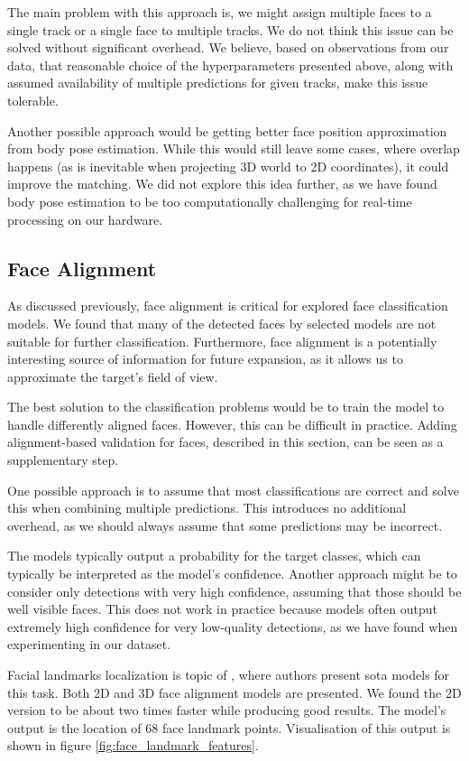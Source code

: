 The main problem with this approach is, we might assign multiple faces to a single track or a single face to multiple tracks. We do not think this issue can be solved without significant overhead. We believe, based on observations from our data, that reasonable choice of the hyperparameters presented above, along with assumed availability of multiple predictions for given tracks, make this issue tolerable.

Another possible approach would be getting better face position approximation from body pose estimation. While this would still leave some cases, where overlap happens (as is inevitable when projecting 3D world to 2D coordinates), it could improve the matching. We did not explore this idea further, as we have found body pose estimation to be too computationally challenging for real-time processing on our hardware.


\subsection{Face Alignment}

As discussed previously, face alignment is critical for explored face classification models. We found that many of the detected faces by selected models are not suitable for further classification. Furthermore, face alignment is a potentially interesting source of information for future expansion, as it allows us to approximate the target's field of view.

The best solution to the classification problems would be to train the model to handle differently aligned faces. However, this can be difficult in practice. Adding alignment-based validation for faces, described in this section, can be seen as a supplementary step. 

One possible approach is to assume that most classifications are correct and solve this when combining multiple predictions. This introduces no additional overhead, as we should always assume that some predictions may be incorrect.

The models typically output a probability for the target classes, which can typically be interpreted as the model's confidence. Another approach might be to consider only detections with very high confidence, assuming that those should be well visible faces. This does not work in practice because models often output extremely high confidence for very low-quality detections, as we have found when experimenting in our dataset.

Facial landmarks localization is topic of \cite{bulat2017far_face_alignment}, where authors present \gls{sota} models for this task. Both 2D and 3D face alignment models are presented. We found the 2D version to be about two times faster while producing good results. The model's output is the location of 68 face landmark points. Visualisation of this output is shown in figure \ref{fig:face_landmark_features}.

